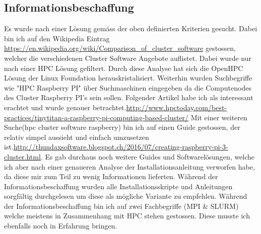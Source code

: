 \subsection{Informationsbeschaffung}
Es wurde nach einer Lösung gemäss der oben definierten Kriterien gesucht. Dabei bin ich auf den Wikipedia Eintrag \hyperref[Wikipedia Eintrag]{https://en.wikipedia.org/wiki/Comparison\_of\_cluster\_software} gestossen, welcher die verschiedenen Cluster Software Angebote auflistet. Dabei wurde nur nach einer HPC Lösung gefiltert. Durch diese Analyse hat sich die OpenHPC Lösung der Linux Foundation herauskristalisiert. Weiterhin wurden Suchbegriffe wie "HPC Raspberry PI" über Suchmaschinen eingegeben da die Computenodes des Cluster Raspberry PI's sein sollen. Folgender Artikel habe ich als interessant erachtet und wurde genauer betrachtet.\hyperref[TinyTitan]{http://www.hpctoday.com/best-practices/tinytitan-a-raspberry-pi-computing-based-cluster/}
Mit einer weiteren Suche(hpc cluster software raspberry) bin ich auf einen Guide gestossen, der relativ simpel aussieht und einfach umzusetzen ist.\hyperref[Eigenbau]{http://thundaxsoftware.blogspot.ch/2016/07/creating-raspberry-pi-3-cluster.html}. Es gab durchaus noch weitere Guides und Softwarelösungen, welche ich aber nach einer genaueren Analyse der Installationsanleitung verworfen habe, da diese mir zum Teil zu wenig Informationen lieferten. Während der Informationsbeschaffung wurden alle Installationsskripte und Anleitungen sorgfältig durchgelesen um diese als mögliche Variante zu empfehlen. Während der Informationsbeschaffung bin ich auf zwei Fachbegriffe (MPI \& SLURM) welche meistens in Zusammenhang mit HPC stehen gestossen. Diese musste ich ebenfalls noch in Erfahrung bringen.





